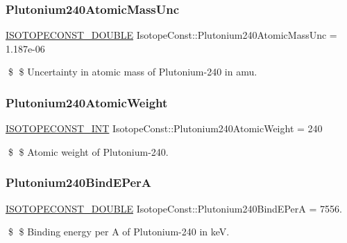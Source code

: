 \subsubsection{\texorpdfstring{Plutonium240\+Atomic\+Mass\+Unc}{Plutonium240AtomicMassUnc}}
{\footnotesize\ttfamily \mbox{\hyperlink{group___isotope_const-_macros_ga8f45a7272ce02c0b4c65c44636ed719a}{I\+S\+O\+T\+O\+P\+E\+C\+O\+N\+S\+T\+\_\+\+D\+O\+U\+B\+LE}} Isotope\+Const\+::\+Plutonium240\+Atomic\+Mass\+Unc = 1.\+187e-\/06}

\$ \$ Uncertainty in atomic mass of Plutonium-\/240 in amu. \mbox{\label{group___isotope_const-_plutonium-_pu240_gad76f0090d641fef2af4e9b0c33260a66}} 
\subsubsection{\texorpdfstring{Plutonium240\+Atomic\+Weight}{Plutonium240AtomicWeight}}
{\footnotesize\ttfamily \mbox{\hyperlink{group___isotope_const-_macros_ga5f18360b3e99483a35c32d789e62621c}{I\+S\+O\+T\+O\+P\+E\+C\+O\+N\+S\+T\+\_\+\+I\+NT}} Isotope\+Const\+::\+Plutonium240\+Atomic\+Weight = 240}

\$ \$ Atomic weight of Plutonium-\/240. \mbox{\label{group___isotope_const-_plutonium-_pu240_gadb4bd0dacc23ea65e6ad55fdd4013fec}} 
\subsubsection{\texorpdfstring{Plutonium240\+Bind\+E\+PerA}{Plutonium240BindEPerA}}
{\footnotesize\ttfamily \mbox{\hyperlink{group___isotope_const-_macros_ga8f45a7272ce02c0b4c65c44636ed719a}{I\+S\+O\+T\+O\+P\+E\+C\+O\+N\+S\+T\+\_\+\+D\+O\+U\+B\+LE}} Isotope\+Const\+::\+Plutonium240\+Bind\+E\+PerA = 7556.}

\$ \$ Binding energy per A of Plutonium-\/240 in keV. \mbox{\label{group___isotope_const-_plutonium-_pu240_ga24b37e810da8048c94c110ab050fee58}} 
